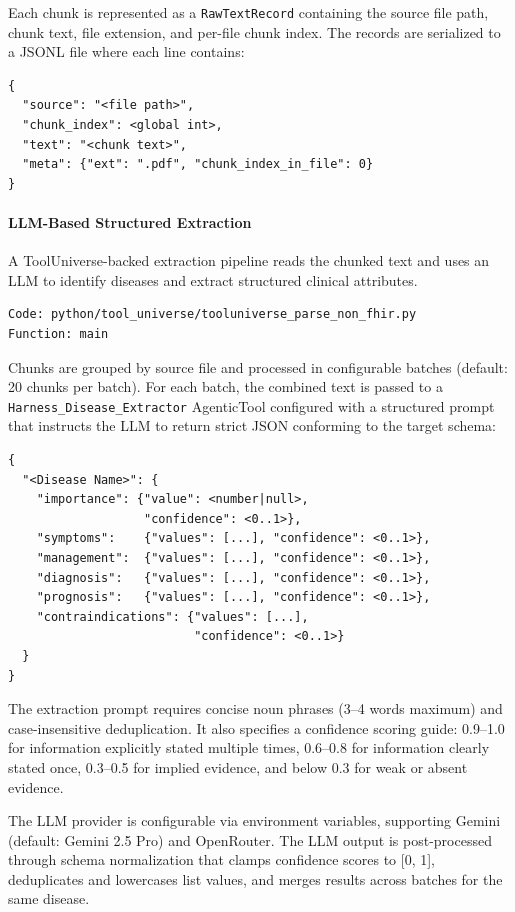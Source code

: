 Each chunk is represented as a \texttt{RawTextRecord} containing the source file path, chunk text, file extension, and per-file chunk index. The records are serialized to a JSONL file where each line contains:
\begin{verbatim}
{
  "source": "<file path>",
  "chunk_index": <global int>,
  "text": "<chunk text>",
  "meta": {"ext": ".pdf", "chunk_index_in_file": 0}
}
\end{verbatim}

\paragraph{LLM-Based Structured Extraction}
A ToolUniverse-backed extraction pipeline reads the chunked text and uses an LLM to identify diseases and extract structured clinical attributes.

\begin{verbatim}
Code: python/tool_universe/tooluniverse_parse_non_fhir.py
Function: main
\end{verbatim}

Chunks are grouped by source file and processed in configurable batches (default: 20 chunks per batch). For each batch, the combined text is passed to a \texttt{Harness\_Disease\_Extractor} AgenticTool configured with a structured prompt that instructs the LLM to return strict JSON conforming to the target schema:
\begin{verbatim}
{
  "<Disease Name>": {
    "importance": {"value": <number|null>,
                   "confidence": <0..1>},
    "symptoms":    {"values": [...], "confidence": <0..1>},
    "management":  {"values": [...], "confidence": <0..1>},
    "diagnosis":   {"values": [...], "confidence": <0..1>},
    "prognosis":   {"values": [...], "confidence": <0..1>},
    "contraindications": {"values": [...],
                          "confidence": <0..1>}
  }
}
\end{verbatim}

The extraction prompt requires concise noun phrases (3--4 words maximum) and case-insensitive deduplication. It also specifies a confidence scoring guide: 0.9--1.0 for information explicitly stated multiple times, 0.6--0.8 for information clearly stated once, 0.3--0.5 for implied evidence, and below 0.3 for weak or absent evidence.

The LLM provider is configurable via environment variables, supporting Gemini (default: Gemini 2.5 Pro) and OpenRouter. The LLM output is post-processed through schema normalization that clamps confidence scores to [0, 1], deduplicates and lowercases list values, and merges results across batches for the same disease.

